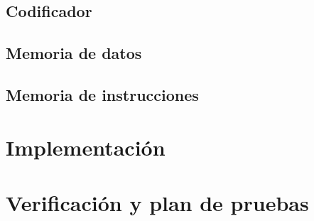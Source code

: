 \documentclass[paper=letter, fontsize=12pt]{article}
\begin{document}
\subsection{Codificador}

\subsection{Memoria de datos}

\subsection{Memoria de instrucciones}

\section{Implementación}

\section{Verificación y plan de pruebas}
\end{document}
